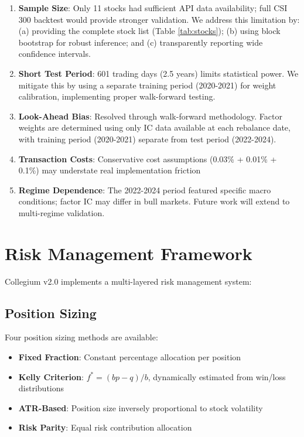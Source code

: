 \documentclass[12pt]{article}
\begin{document}
\begin{enumerate}
    \item \textbf{Sample Size}: Only 11 stocks had sufficient API data availability; full CSI 300 backtest would provide stronger validation. We address this limitation by: (a) providing the complete stock list (Table \ref{tab:stocks}); (b) using block bootstrap for robust inference; and (c) transparently reporting wide confidence intervals.

    \item \textbf{Short Test Period}: 601 trading days (2.5 years) limits statistical power. We mitigate this by using a separate training period (2020-2021) for weight calibration, implementing proper walk-forward testing.

    \item \textbf{Look-Ahead Bias}: Resolved through walk-forward methodology. Factor weights are determined using only IC data available at each rebalance date, with training period (2020-2021) separate from test period (2022-2024).

    \item \textbf{Transaction Costs}: Conservative cost assumptions (0.03\% + 0.01\% + 0.1\%) may understate real implementation friction

    \item \textbf{Regime Dependence}: The 2022-2024 period featured specific macro conditions; factor IC may differ in bull markets. Future work will extend to multi-regime validation.
\end{enumerate}

\section{Risk Management Framework}

Collegium v2.0 implements a multi-layered risk management system:

\subsection{Position Sizing}

Four position sizing methods are available:
\begin{itemize}
    \item \textbf{Fixed Fraction}: Constant percentage allocation per position
    \item \textbf{Kelly Criterion}: $f^* = (bp - q)/b$, dynamically estimated from win/loss distributions
    \item \textbf{ATR-Based}: Position size inversely proportional to stock volatility
    \item \textbf{Risk Parity}: Equal risk contribution allocation
\end{itemize}
\end{document}
